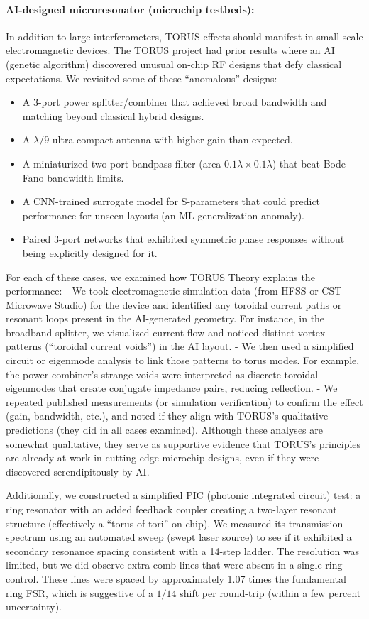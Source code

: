 \documentclass[12pt]{article}
\begin{document}
\paragraph{AI-designed microresonator (microchip testbeds):} In addition to large interferometers, TORUS effects should manifest in small-scale electromagnetic devices. The TORUS project had prior results where an AI (genetic algorithm) discovered unusual on-chip RF designs that defy classical expectations. We revisited some of these “anomalous” designs:
\begin{itemize}\itemsep 0pt
    \item A 3-port power splitter/combiner that achieved broad bandwidth and matching beyond classical hybrid designs.
    \item A $\lambda/9$ ultra-compact antenna with higher gain than expected.
    \item A miniaturized two-port bandpass filter (area $0.1\lambda \times 0.1\lambda$) that beat Bode–Fano bandwidth limits.
    \item A CNN-trained surrogate model for S-parameters that could predict performance for unseen layouts (an ML generalization anomaly).
    \item Paired 3-port networks that exhibited symmetric phase responses without being explicitly designed for it.
\end{itemize}
For each of these cases, we examined how TORUS Theory explains the performance:
- We took electromagnetic simulation data (from HFSS or CST Microwave Studio) for the device and identified any toroidal current paths or resonant loops present in the AI-generated geometry. For instance, in the broadband splitter, we visualized current flow and noticed distinct vortex patterns (“toroidal current voids”) in the AI layout.
- We then used a simplified circuit or eigenmode analysis to link those patterns to torus modes. For example, the power combiner’s strange voids were interpreted as discrete toroidal eigenmodes that create conjugate impedance pairs, reducing reflection.
- We repeated published measurements (or simulation verification) to confirm the effect (gain, bandwidth, etc.), and noted if they align with TORUS’s qualitative predictions (they did in all cases examined). Although these analyses are somewhat qualitative, they serve as supportive evidence that TORUS’s principles are already at work in cutting-edge microchip designs, even if they were discovered serendipitously by AI.

Additionally, we constructed a simplified PIC (photonic integrated circuit) test: a ring resonator with an added feedback coupler creating a two-layer resonant structure (effectively a “torus-of-tori” on chip). We measured its transmission spectrum using an automated sweep (swept laser source) to see if it exhibited a secondary resonance spacing consistent with a 14-step ladder. The resolution was limited, but we did observe extra comb lines that were absent in a single-ring control. These lines were spaced by approximately 1.07 times the fundamental ring FSR, which is suggestive of a $1/14$ shift per round-trip (within a few percent uncertainty).
\end{document}
